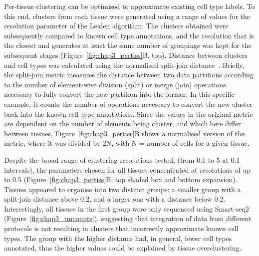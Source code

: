 Per-tissue clustering can be optimised to approximate existing cell type labels. To this end, clusters from each tissue were generated using a range of values for the resolution parameter of the Leiden algorithm. The clusters obtained were subsequently compared to known cell type annotations, and the resolution that is the closest and generates at least the same number of groupings was kept for the subsequent stages (Figure~\ref{fig:chap3_pertiss}B, top). Distance between clusters and cell types was calculated using the normalised split-join distance~\citep{dongen_performance_2000}. Briefly, the split-join metric measures the distance between two data partitions according to the number of element-wise division (split) or merge (join) operations necessary to fully convert the new partition into the former. In this specific example, it counts the number of operations necessary to convert the new cluster back into the known cell type annotations. Since the values in the original metric are dependent on the number of elements being cluster, and which here differ between tissues, Figure~\ref{fig:chap3_pertiss}B shows a normalised version of the metric, where it was divided by 2N, with N = number of cells for a given tissue.

Despite the broad range of clustering resolutions tested, (from 0.1 to 5 at 0.1 intervals), the parameters chosen for all tissues concentrated at resolutions of up to 0.5 (Figure~\ref{fig:chap3_pertiss}B, top shaded box and bottom expansion). Tissues appeared to organise into two distinct groups: a smaller group with a split-join distance above 0.2, and a larger one with a distance below 0.2. Interestingly, all tissues in the first group were only sequenced using Smart-seq2 (Figure~\ref{fig:chap3_tmcounts}), suggesting that integration of data from different protocols is not resulting in clusters that incorrectly approximate known cell types. The group with the higher distance had, in general, fewer cell types annotated, thus the higher values could be explained by tissue overclustering.

